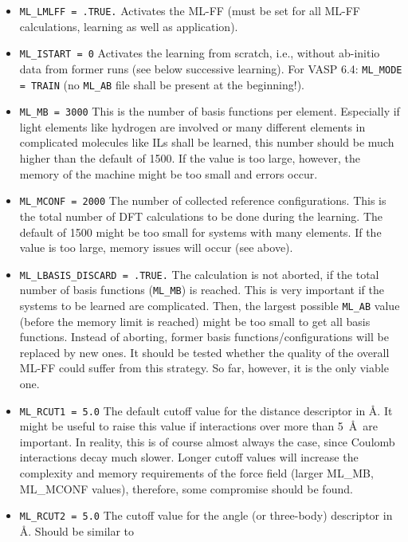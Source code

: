 \documentclass[a4paper,11pt]{article}
\begin{document}
\begin{itemize}
 \item \texttt{ML\_LMLFF = .TRUE.} Activates the ML-FF (must be set for all ML-FF calculations, 
    learning as well as application). 
 \item \texttt{ML\_ISTART = 0} Activates the learning from scratch, i.e., without ab-initio data from 
    former runs (see below successive learning). For VASP 6.4: \texttt{ML\_MODE = TRAIN} (no \texttt{ML\_AB} file 
    shall be present at the beginning!).
 \item \texttt{ML\_MB = 3000} This is the number of basis functions per element. Especially if light
    elements like hydrogen are involved or many different elements in complicated molecules like ILs 
    shall be learned, this number should be much higher than the default of 1500. If the value is
     too large, however, the memory of the machine might be too small and errors occur.
 \item \texttt{ML\_MCONF = 2000} The number of collected reference configurations. This is the total number
    of DFT calculations to be done during 
    the learning. The default of 1500 might be too small for systems with many elements. If the value is
     too large, memory issues will occur (see above).
 \item \texttt{ML\_LBASIS\_DISCARD = .TRUE.} The calculation is not aborted, if the total number of basis 
   functions (\texttt{ML\_MB}) is reached. This is very important if the systems to be learned are complicated. 
   Then, the largest possible \texttt{ML\_AB} value (before the memory limit is reached) might be too small 
   to get all basis functions. Instead of aborting, former basis functions/configurations will be
   replaced by new ones.
   It should be tested whether the quality of the overall ML-FF could suffer from this strategy. So far, however, 
   it is the only viable one. 
 \item \texttt{ML\_RCUT1 = 5.0} The default cutoff value for the distance descriptor in \AA.
   It might be useful to raise this value if interactions over more than 5~\AA~are important. In reality, 
   this is of course almost always the case, since Coulomb interactions decay much slower. Longer cutoff values 
   will increase the complexity and memory requirements of the force field (larger ML\_MB, ML\_MCONF values), therefore,
   some compromise should be found.
 \item \texttt{ML\_RCUT2 = 5.0} The cutoff value for the angle (or three-body) descriptor in \AA. Should be similar to

\end{itemize}
\end{document}
